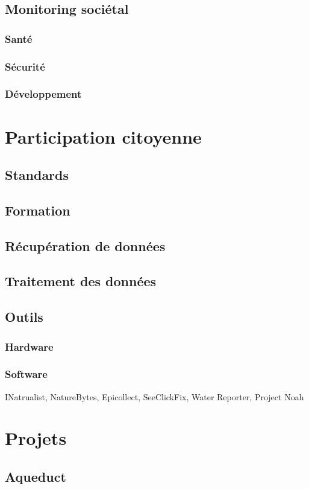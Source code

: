 \documentclass[10pt, conference, compsocconf]{llncs}
\begin{document}
\subsection{Monitoring sociétal}
\subsubsection{Santé}
\subsubsection{Sécurité}
\subsubsection{Développement}

\section{Participation citoyenne}
\subsection{Standards}
\subsection{Formation}
\subsection{Récupération de données}
\subsection{Traitement des données}
\subsection{Outils}
\subsubsection{Hardware}
\subsubsection{Software}
INatrualist, NatureBytes, Epicollect, SeeClickFix, Water Reporter, Project Noah		

\section{Projets}
\subsection{Aqueduct}
\end{document}
